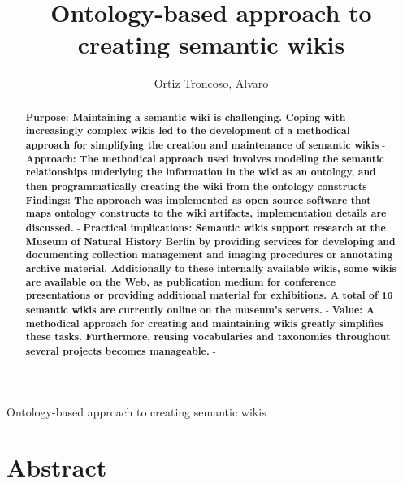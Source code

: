 \documentclass{ijcs_template}
\begin{document}
%
\catchline{}{}{}{}{}
%

{Ontology-based approach to creating semantic wikis}

\title{Ontology-based approach to creating semantic wikis}

\author{Ortiz Troncoso, Alvaro}

\address{Museum f\"ur Naturkunde - Leibniz Institute for Research on Evolution and Biodiversity, Invalidenstrasse 43, 10115 Berlin, Germany 
}

\maketitle

\begin{history}
\end{history}

\section*{Abstract}
\begin{abstract}
\newline\textbf{Purpose: Maintaining a semantic wiki is challenging. Coping with increasingly complex wikis led to the development of a methodical approach for simplifying the creation and maintenance of semantic wikis} - 
\newline\textbf{Approach: The methodical approach used involves modeling the semantic relationships underlying the information in the wiki as an ontology, and then programmatically creating the wiki from the ontology constructs} - 
\newline\textbf{Findings: The approach was implemented as open source software that maps ontology constructs to the wiki artifacts, implementation details are discussed.} - 
\newline\textbf{Practical implications: Semantic wikis support research at the Museum of Natural History Berlin by providing services for developing and documenting collection management and imaging procedures or annotating archive material. Additionally to these internally available wikis, some wikis are available on the Web, as publication medium for conference presentations or providing additional material for exhibitions. A total of 16 semantic wikis are currently online on the museum's servers.} - 
\newline\textbf{Value: A methodical approach for creating and maintaining wikis greatly simplifies these tasks. Furthermore, reusing vocabularies and taxonomies throughout several projects becomes manageable.} -

\end{abstract}
\end{document}
